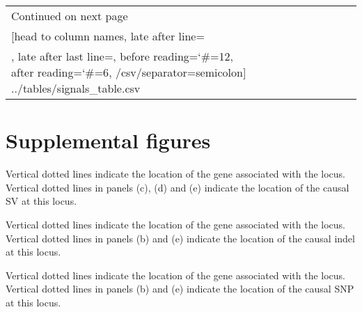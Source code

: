 \begin{landscape}
\begin{ThreePartTable}
\begin{longtable}{llcclccccl}
			\bottomrule
			Continued on next page \\
			\endfoot

			\bottomrule \insertTableNotes
			\endlastfoot
			\csvreader[head to column names,
			late after line=\\,
			late after last line=,
			before reading={\catcode`\#=12},
			after reading={\catcode`\#=6},
			/csv/separator=semicolon]%
			{../tables/signals_table.csv}{}{\Trait & \Locus & \Chromosome & \Pvalues & \Gene & \Platypus & \Vg & \Paragraph & \Kmers & \Study}

		\end{longtable}

	\end{ThreePartTable}

\end{landscape}
\clearpage

\section*{Supplemental figures}
\label{annexe-sv-gwas-figures}

%
{Vertical dotted lines indicate the location of the  gene associated with the locus.}
%
{Vertical dotted lines in panels (c), (d) and (e) indicate the location of the causal SV at this locus.}

%
{Vertical dotted lines indicate the location of the  gene associated with the locus.}
%
{Vertical dotted lines in panels (b) and (e) indicate the location of the causal indel at this locus.}

%
{Vertical dotted lines indicate the location of the  gene associated with the locus.}
%
{Vertical dotted lines in panels (b) and (e) indicate the location of the causal SNP at this locus.}

